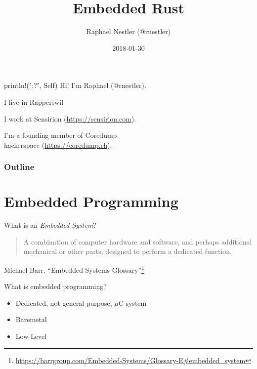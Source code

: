 \documentclass[aspectratio=1610,14pt,t]{beamer}
\title{Embedded Rust}
\date{2018-01-30}
\author{Raphael Nestler (@rnestler)}
\institute{Rust Zürichsee Meetup}
\begin{document}
\pagecolor{almostwhite}  %
\maketitle


\begin{frame}[c]{println!("{:?}", Self)}
  Hi! I'm Raphael (@rnestler).

  \pause I live in Rapperswil

  \pause I work at Sensirion ({\small \url{https://sensirion.com}}).

  \pause I'm a founding member of Coredump\\hackerspace ({\small \url{https://coredump.ch}}).
\end{frame}


\begin{frame}
  \frametitle{Outline}
  \setcounter{tocdepth}{1}
  \tableofcontents
\end{frame}



\section{Embedded Programming}

\begin{frame}[c]{What is an \emph{Embedded System}?}
  \begin{quote}
    A combination of computer hardware and software, and perhaps
    additional mechanical or other parts, designed to perform a dedicated
    function.
  \end{quote}
  Michael Barr. ``Embedded Systems Glossary''\footnote{\tiny\url{https://barrgroup.com/Embedded-Systems/Glossary-E\#embedded\_system}}
\end{frame}

\begin{frame}[c]{What is embedded programming?}
  \begin{itemize}
    \item Dedicated, not general purpose, $\mu$C system
    \item<1-> Baremetal
    \item<1-> Low-Level
  \end{itemize}
\end{frame}
\end{document}
